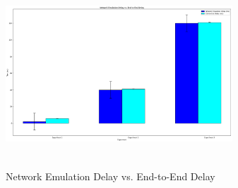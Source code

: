\documentclass[conference]{IEEEtran}
\begin{document}
\begin{figure}[t]
\includegraphics[width=8.5cm, height=7cm]{vs_graph.png}
 \caption{Network Emulation Delay vs. End-to-End Delay}
 \label{fig:1}
\end{figure}
\end{document}
